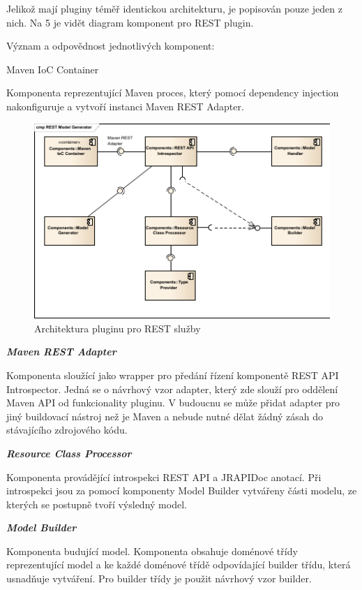 \documentclass[11pt,twoside,a4paper]{book}
\begin{document}
Jelikož mají pluginy téměř identickou architekturu, je popisován pouze jeden z nich. Na 5 je
vidět diagram komponent pro REST plugin.

Význam a odpovědnost jednotlivých komponent:

Maven IoC Container

Komponenta reprezentující Maven proces, který pomocí dependency injection nakonfiguruje
a vytvoří instanci Maven REST Adapter.

\begin{figure}[h]
\begin{center}
\includegraphics[width=13cm]{images-pdf/REST Model Generator.pdf}
\caption{Architektura pluginu pro REST služby}
\label{fig:logo}
\end{center}
\end{figure}

\textbf{\textit{Maven REST Adapter}}

Komponenta sloužící jako wrapper pro předání řízení komponentě REST API Introspector.
Jedná se o návrhový vzor adapter, který zde slouží pro oddělení Maven API od funkcionality
pluginu. V budoucnu se může přidat adapter pro jiný buildovací nástroj než je Maven a
nebude nutné dělat žádný zásah do stávajícího zdrojového kódu.

\textbf{\textit{Resource Class Processor}}

Komponenta provádějící introspekci REST API a JRAPIDoc anotací. Při introspekci jsou za
pomocí komponenty Model Builder vytvářeny části modelu, ze kterých se postupně tvoří
výsledný model.

\textbf{\textit{Model Builder}}

Komponenta budující model. Komponenta obsahuje doménové třídy reprezentující model a
ke každé doménové třídě odpovídající builder třídu, která usnadňuje vytváření. Pro builder
třídy je použit návrhový vzor builder.
\end{document}
